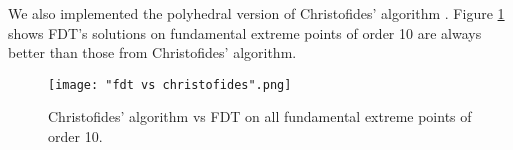 We also implemented the polyhedral version of Christofides' algorithm \cite{Wolsey1980}. Figure \ref{fdtvschris} shows FDT's solutions on fundamental extreme points of order 10 are always better than those from Christofides' algorithm.
\begin{figure}[h!]
\centering
\texttt{[image: "fdt vs christofides".png]}
\caption{Christofides' algorithm vs FDT on all fundamental extreme points of order 10.}
\label{fdtvschris}
\end{figure}
